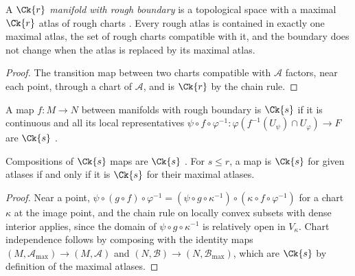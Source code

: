 \begin{definition}
  \label{def:rough-manifold}
  \leanok
  A \emph{$\Ck{r}$ manifold with rough boundary} is a topological space with a maximal $\Ck{r}$
  atlas of rough charts \cite[Definition 3.5.1(b), p.~278]{GN26}. Every rough atlas is contained
  in exactly one maximal atlas, the set of rough charts compatible with it, and the boundary does
  not change when the atlas is replaced by its maximal atlas.
\end{definition}

\begin{proof}
  \leanok
  The transition map between two charts compatible with $\mathcal{A}$ factors, near each point,
  through a chart of $\mathcal{A}$, and is $\Ck{r}$ by the chain rule.
\end{proof}

\begin{definition}[$\Ck{s}$ maps]
  \label{def:rough-contmdiff}
  \leanok
  A map $f\colon M \to N$ between manifolds with rough boundary is $\Ck{s}$ if it is
  continuous and all its local representatives
  $\psi \circ f \circ \varphi^{-1}\colon \varphi(f^{-1}(U_\psi) \cap U_\varphi) \to F$ are $\Ck{s}$
  \cite[Definition 3.5.11, p.~281]{GN26}.
\end{definition}

\begin{proposition}
  \label{prop:rough-comp}
  \leanok
  Compositions of $\Ck{s}$ maps are $\Ck{s}$ \cite[Proposition 3.5.12, p.~281]{GN26}. For
  $s \le r$, a map is $\Ck{s}$ for given atlases if and only if it is $\Ck{s}$ for their maximal
  atlases.
\end{proposition}

\begin{proof}
  \leanok
  Near a point, $\psi \circ (g \circ f) \circ \varphi^{-1}
  = (\psi \circ g \circ \kappa^{-1}) \circ (\kappa \circ f \circ \varphi^{-1})$ for a chart
  $\kappa$ at the image point, and the chain rule on locally convex subsets with dense interior
  applies, since the domain of $\psi \circ g \circ \kappa^{-1}$ is relatively open in
  $V_\kappa$. Chart independence follows by composing with the identity maps
  $(M, \mathcal{A}_{\max}) \to (M, \mathcal{A})$ and $(N, \mathcal{B}) \to (N, \mathcal{B}_{\max})$,
  which are $\Ck{s}$ by definition of the maximal atlases.
\end{proof}

